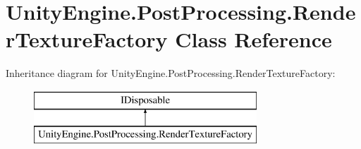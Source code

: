 \hypertarget{class_unity_engine_1_1_post_processing_1_1_render_texture_factory}{}\section{Unity\+Engine.\+Post\+Processing.\+Render\+Texture\+Factory Class Reference}
\label{class_unity_engine_1_1_post_processing_1_1_render_texture_factory}
Inheritance diagram for Unity\+Engine.\+Post\+Processing.\+Render\+Texture\+Factory\+:\begin{figure}[H]
\begin{center}
\leavevmode
\includegraphics[height=2.000000cm]{class_unity_engine_1_1_post_processing_1_1_render_texture_factory}
\end{center}
\end{figure}
